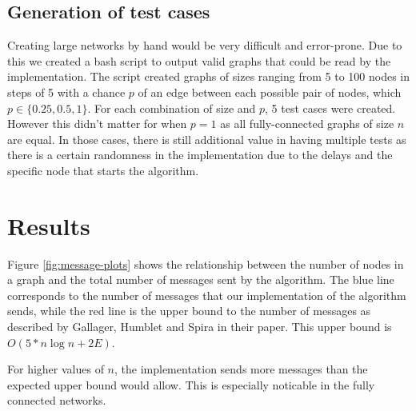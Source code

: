 \documentclass[a4paper]{article}
\begin{document}
\subsection{Generation of test cases}
Creating large networks by hand would be very difficult and error-prone. Due to
this we created a bash script to output valid graphs that could be read by the
implementation. The script created graphs of sizes ranging from 5 to 100 nodes
in steps of 5 with a chance $p$ of an edge between each possible pair of nodes,
which $p \in \{0.25, 0.5, 1\}$. For each combination of size and $p$, 5 test
cases were created. However this didn't matter for when $p = 1$ as all
fully-connected graphs of size $n$ are equal. In those cases, there is still
additional value in having multiple tests as there is a certain randomness in
the implementation due to the delays and the specific node that starts the
algorithm.

\section{Results}
\label{sec:results}

Figure \ref{fig:message-plots} shows the relationship between the number of
nodes in a graph and the total number of messages sent by the algorithm. The
blue line corresponds to the number of messages that our implementation of the
algorithm sends, while the red line is the upper bound to the number of
messages as described by Gallager, Humblet and Spira in their paper. This
upper bound is $O(5 * n \log n + 2 E)$.

For higher values of $n$, the implementation sends more messages than the
expected upper bound would allow. This is especially noticable in the fully
connected networks.
\end{document}
